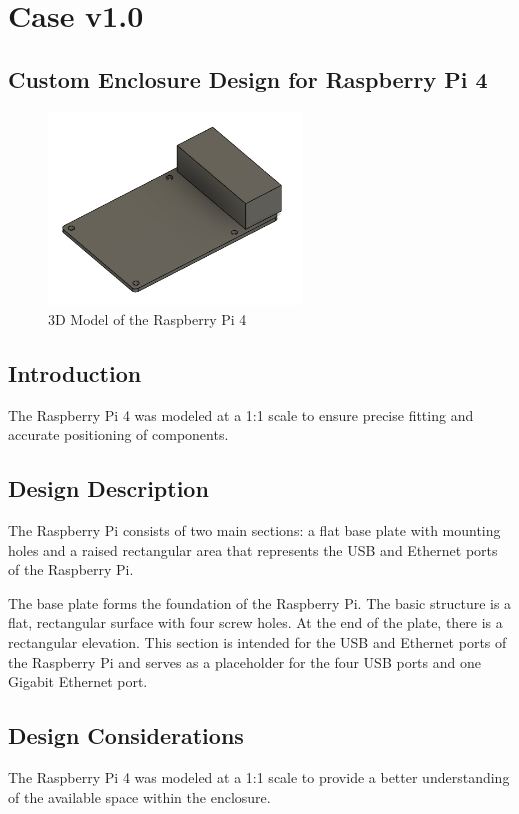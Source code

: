 \newpage

\section{Case v1.0}

\subsection{Custom Enclosure Design for Raspberry Pi 4}

\begin{figure}[h]
\centering
\includegraphics[width=0.6\textwidth]{assets/DG_Raspi4(1)}
\caption{3D Model of the Raspberry Pi 4}
\end{figure}

\subsection*{Introduction}
The Raspberry Pi 4 was modeled at a 1:1 scale to ensure precise fitting and accurate positioning of components.

\subsection*{Design Description}
The Raspberry Pi consists of two main sections: a flat base plate with mounting holes and a raised rectangular area that represents the USB and Ethernet ports of the Raspberry Pi.

The base plate forms the foundation of the Raspberry Pi. The basic structure is a flat, rectangular surface with four screw holes. At the end of the plate, there is a rectangular elevation. This section is intended for the USB and Ethernet ports of the Raspberry Pi and serves as a placeholder for the four USB ports and one Gigabit Ethernet port.

\subsection*{Design Considerations}
The Raspberry Pi 4 was modeled at a 1:1 scale to provide a better understanding of the available space within the enclosure.



